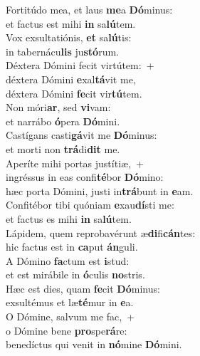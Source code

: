 \evenverse Fortitúdo mea, et laus \textbf{me}a \textbf{Dó}minus:~\*\\
\evenverse et factus est mihi \textbf{in} sa\textbf{lú}tem.\\
\oddverse Vox exsultatiónis, \textbf{et} sa\textbf{lú}tis:~\*\\
\oddverse in tabernácu\textbf{lis} ju\textbf{stó}rum.\\
\evenverse Déxtera Dómini fecit virtútem:~+\\
\evenverse  déxtera Dómini \textbf{e}xal\textbf{tá}vit me,~\*\\
\evenverse déxtera Dómini \textbf{fe}cit vir\textbf{tú}tem.\\
\oddverse Non móri\textbf{ar}, sed \textbf{vi}vam:~\*\\
\oddverse et narrábo \textbf{ó}pera \textbf{Dó}mini.\\
\evenverse Castígans casti\textbf{gá}vit me \textbf{Dó}minus:~\*\\
\evenverse et morti non \textbf{trá}di\textbf{dit} me.\\
\oddverse Aperíte mihi portas justítiæ,~+\\
\oddverse  ingréssus in eas confi\textbf{té}bor \textbf{Dó}mino:~\*\\
\oddverse hæc porta Dómini, justi in\textbf{trá}bunt in \textbf{e}am.\\
\evenverse Confitébor tibi quóniam \textbf{e}xau\textbf{dí}sti me:~\*\\
\evenverse et factus es mihi \textbf{in} sa\textbf{lú}tem.\\
\oddverse Lápidem, quem reprobavérunt æ\textbf{di}fi\textbf{cán}tes:~\*\\
\oddverse hic factus est in \textbf{ca}put \textbf{án}guli.\\
\evenverse A Dómino \textbf{fa}ctum est \textbf{i}stud:~\*\\
\evenverse et est mirábile in \textbf{ó}culis \textbf{no}stris.\\
\oddverse Hæc est dies, quam \textbf{fe}cit \textbf{Dó}minus:~\*\\
\oddverse exsultémus et læ\textbf{té}mur in \textbf{e}a.\\
\evenverse O Dómine, salvum me fac,~+\\
\evenverse  o Dómine bene \textbf{pro}spe\textbf{rá}re:~\*\\
\evenverse benedíctus qui venit in \textbf{nó}mine \textbf{Dó}mini.\\
